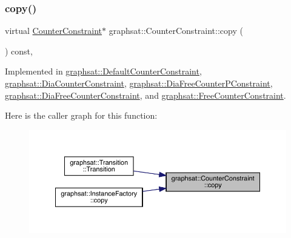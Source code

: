 \subsubsection{\texorpdfstring{copy()}{copy()}}
{\footnotesize\ttfamily virtual \mbox{\hyperlink{classgraphsat_1_1_counter_constraint}{Counter\+Constraint}}$\ast$ graphsat\+::\+Counter\+Constraint\+::copy (\begin{DoxyParamCaption}{ }\end{DoxyParamCaption}) const\hspace{0.3cm}{\ttfamily [private]}, {}}



Implemented in \mbox{\hyperlink{classgraphsat_1_1_default_counter_constraint_a5a5b4fcebd097f209ebdebcde1a7321f}{graphsat\+::\+Default\+Counter\+Constraint}}, \mbox{\hyperlink{classgraphsat_1_1_dia_counter_constraint_a8298e206d438c302fa43a568bec517ae}{graphsat\+::\+Dia\+Counter\+Constraint}}, \mbox{\hyperlink{classgraphsat_1_1_dia_free_counter_p_constraint_a75e3eccebbe42daf47b10209f6ab0b59}{graphsat\+::\+Dia\+Free\+Counter\+P\+Constraint}}, \mbox{\hyperlink{classgraphsat_1_1_dia_free_counter_constraint_a1405e3fcda5895d1a3d274670a43699e}{graphsat\+::\+Dia\+Free\+Counter\+Constraint}}, and \mbox{\hyperlink{classgraphsat_1_1_free_counter_constraint_ac47312ffc877f233912491bf380769a9}{graphsat\+::\+Free\+Counter\+Constraint}}.

Here is the caller graph for this function\+:
\nopagebreak
\begin{figure}[H]
\begin{center}
\leavevmode
\includegraphics[width=350pt]{classgraphsat_1_1_counter_constraint_a880eb6520fcf80de35071d62cb31a640_icgraph}
\end{center}
\end{figure}
\mbox{\label{classgraphsat_1_1_counter_constraint_aa467ff66b37a1cbc69f5eddb269aaa0d}} 
